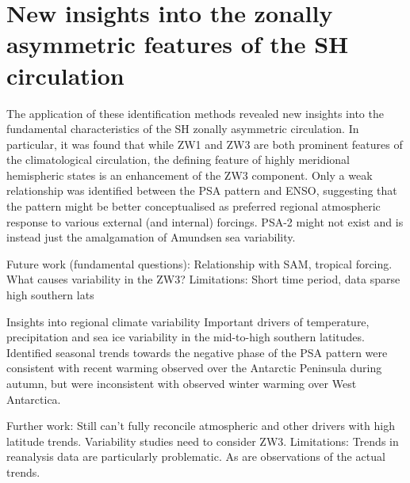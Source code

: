 

\section{New insights into the zonally asymmetric features of the SH circulation}

The application of these identification methods revealed new insights into the fundamental characteristics of the SH zonally asymmetric circulation. In particular, it was found that while ZW1 and ZW3 are both prominent features of the climatological circulation, the defining feature of highly meridional hemispheric states is an enhancement of the ZW3 component. Only a weak relationship was identified between the PSA pattern and ENSO, suggesting that the pattern might be better conceptualised as preferred regional atmospheric response to various external (and internal) forcings. PSA-2 might not exist and is instead just the amalgamation of Amundsen sea variability.

Future work (fundamental questions): Relationship with SAM, tropical forcing. What causes variability in the ZW3?
Limitations: Short time period, data sparse high southern lats


Insights into regional climate variability
Important drivers of temperature, precipitation and sea ice variability in the mid-to-high southern latitudes. 
Identified seasonal trends towards the negative phase of the PSA pattern were consistent with recent warming observed over the Antarctic Peninsula during autumn, but were inconsistent with observed winter warming over West Antarctica. 

Further work: Still can't fully reconcile atmospheric and other drivers with high latitude trends. Variability studies need to consider ZW3.
Limitations: Trends in reanalysis data are particularly problematic. As are observations of the actual trends.


